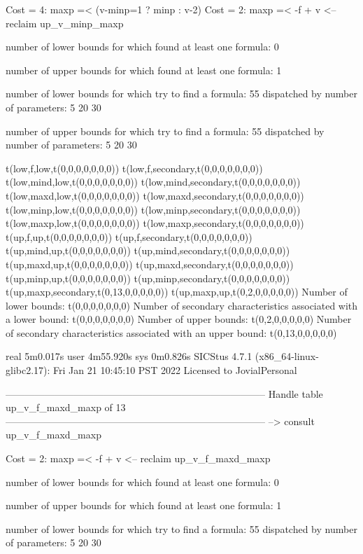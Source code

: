 Cost =  4:  maxp =< (v-minp=1 ? minp : v-2)
Cost =  2:  maxp =< -f + v
<-- reclaim up_v_minp_maxp

number of lower bounds for which found at least one formula: 0

number of upper bounds for which found at least one formula: 1

number of lower bounds for which try to find a formula: 55
dispatched by number of parameters: 5  20  30

number of upper bounds for which try to find a formula: 55
dispatched by number of parameters: 5  20  30

t(low,f,low,t(0,0,0,0,0,0,0))
t(low,f,secondary,t(0,0,0,0,0,0,0))
t(low,mind,low,t(0,0,0,0,0,0,0))
t(low,mind,secondary,t(0,0,0,0,0,0,0))
t(low,maxd,low,t(0,0,0,0,0,0,0))
t(low,maxd,secondary,t(0,0,0,0,0,0,0))
t(low,minp,low,t(0,0,0,0,0,0,0))
t(low,minp,secondary,t(0,0,0,0,0,0,0))
t(low,maxp,low,t(0,0,0,0,0,0,0))
t(low,maxp,secondary,t(0,0,0,0,0,0,0))
t(up,f,up,t(0,0,0,0,0,0,0))
t(up,f,secondary,t(0,0,0,0,0,0,0))
t(up,mind,up,t(0,0,0,0,0,0,0))
t(up,mind,secondary,t(0,0,0,0,0,0,0))
t(up,maxd,up,t(0,0,0,0,0,0,0))
t(up,maxd,secondary,t(0,0,0,0,0,0,0))
t(up,minp,up,t(0,0,0,0,0,0,0))
t(up,minp,secondary,t(0,0,0,0,0,0,0))
t(up,maxp,secondary,t(0,13,0,0,0,0,0))
t(up,maxp,up,t(0,2,0,0,0,0,0))
Number of lower bounds:                                             t(0,0,0,0,0,0,0)
Number of secondary characteristics associated with a lower bound:  t(0,0,0,0,0,0,0)
Number of upper bounds:                                             t(0,2,0,0,0,0,0)
Number of secondary characteristics associated with an upper bound: t(0,13,0,0,0,0,0)

real	5m0.017s
user	4m55.920s
sys	0m0.826s
SICStus 4.7.1 (x86_64-linux-glibc2.17): Fri Jan 21 10:45:10 PST 2022
Licensed to JovialPersonal


--------------------------------------------------------------------------------
Handle table up_v_f_maxd_maxp of 13
--------------------------------------------------------------------------------
--> consult up_v_f_maxd_maxp

Cost =  2:  maxp =< -f + v
<-- reclaim up_v_f_maxd_maxp

number of lower bounds for which found at least one formula: 0

number of upper bounds for which found at least one formula: 1

number of lower bounds for which try to find a formula: 55
dispatched by number of parameters: 5  20  30

